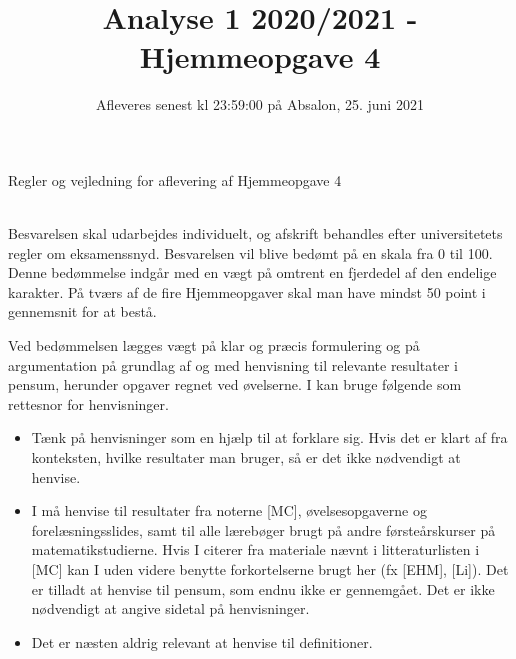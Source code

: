\documentclass{article}
\title{Analyse 1 2020/2021 - Hjemmeopgave 4}
\author{}
\date{\vspace{-1cm}Afleveres senest kl 23:59:00 på Absalon, 25. juni 2021}
\newif\ifrules
\begin{document}
	
	\maketitle
	
	\noindent
	
	
	
	\ifrules
	\newpage
	\noindent
	{\LARGE Regler og vejledning for aflevering af Hjemmeopgave 4}
	
	\noindent\hrulefill \\
	
	\noindent
	Besvarelsen skal udarbejdes individuelt, og afskrift behandles efter universitetets regler om eksamenssnyd. Besvarelsen vil blive bedømt på en skala fra 0 til 100. Denne bedømmelse indgår med en vægt på omtrent en fjerdedel af den endelige karakter. På tværs af de fire Hjemmeopgaver skal man have mindst 50 point i gennemsnit for at bestå.
	
	Ved bedømmelsen lægges vægt på klar og præcis formulering og på argumentation på grundlag af og med henvisning til relevante resultater i pensum, herunder opgaver regnet ved øvelserne. I kan bruge følgende som rettesnor for henvisninger.
	\begin{itemize}
		\item Tænk på henvisninger som en hjælp til at forklare sig. Hvis det er klart af fra konteksten, hvilke resultater man bruger, så er det ikke nødvendigt at henvise.
		
		\item I må henvise til resultater fra noterne [MC], øvelsesopgaverne og forelæsningsslides, samt til alle l\ae{}reb\o{}ger brugt p\aa{} andre f\o{}rste\aa{}rskurser p\aa{} matematikstudierne. Hvis I citerer fra materiale n\ae{}vnt i litteraturlisten i [MC] kan I uden videre benytte forkortelserne brugt her (fx [EHM], [Li]). Det er tilladt at henvise til pensum, som endnu ikke er gennemgået. Det er ikke nødvendigt at angive sidetal på henvisninger. 
		
		\item Det er næsten aldrig relevant at henvise til definitioner.
	\end{itemize}
	
	
\end{document}
